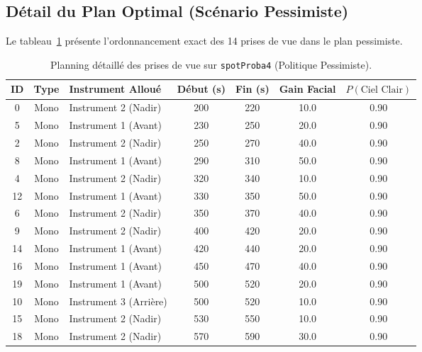 \subsection{Détail du Plan Optimal (Scénario Pessimiste)}
Le tableau~\ref{tab:spot4_schedule} présente l'ordonnancement exact des 14 prises de vue dans le plan pessimiste.

\begin{table}[H]
\centering
\small
\begin{tabularx}{\textwidth}{ccXcccc}
\toprule
\textbf{ID} & \textbf{Type} & \textbf{Instrument Alloué} & \textbf{Début (s)} & \textbf{Fin (s)} & \textbf{Gain Facial} & \textbf{$P(\text{Ciel Clair})$} \\
\midrule
0 & Mono & Instrument 2 (Nadir) & 200 & 220 & 10.0 & 0.90 \\
5 & Mono & Instrument 1 (Avant) & 230 & 250 & 20.0 & 0.90 \\
2 & Mono & Instrument 2 (Nadir) & 250 & 270 & 40.0 & 0.90 \\
8 & Mono & Instrument 1 (Avant) & 290 & 310 & 50.0 & 0.90 \\
4 & Mono & Instrument 2 (Nadir) & 320 & 340 & 10.0 & 0.90 \\
12 & Mono & Instrument 1 (Avant) & 330 & 350 & 50.0 & 0.90 \\
6 & Mono & Instrument 2 (Nadir) & 350 & 370 & 40.0 & 0.90 \\
9 & Mono & Instrument 2 (Nadir) & 400 & 420 & 20.0 & 0.90 \\
14 & Mono & Instrument 1 (Avant) & 420 & 440 & 20.0 & 0.90 \\
16 & Mono & Instrument 1 (Avant) & 450 & 470 & 40.0 & 0.90 \\
19 & Mono & Instrument 1 (Avant) & 500 & 520 & 20.0 & 0.90 \\
10 & Mono & Instrument 3 (Arrière) & 500 & 520 & 10.0 & 0.90 \\
15 & Mono & Instrument 2 (Nadir) & 530 & 550 & 10.0 & 0.90 \\
18 & Mono & Instrument 2 (Nadir) & 570 & 590 & 30.0 & 0.90 \\
\bottomrule
\end{tabularx}
\caption{Planning détaillé des prises de vue sur \texttt{spotProba4} (Politique Pessimiste).}
\label{tab:spot4_schedule}
\end{table}

